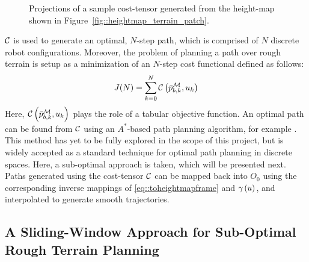 				\begin{figure}
					\centering
					\caption{Projections of a sample cost-tensor generated from the height-map shown in Figure~\ref{fig::heightmap_terrain_patch}.}
					\label{fig::cost_map}
				\end{figure}

			${\cal C}$ is used to generate an optimal, $N$-step path, which is comprised of $N$ discrete robot configurations. Moreover, the problem of planning a path over rough terrain is setup as a minimization of an $N$-step cost functional defined as follows:
				\begin{equation}			
					J(N) = \sum_{k=0}^N {\cal C}\left(\bar{p}^{{\cal M}}_{b,k},u_{k}\right)
				\end{equation}
			Here, ${\cal C}\left(\bar{p}^{{\cal M}}_{b,k},u_{k}\right)$ plays the role of a tabular objective function. An optimal path can be found from ${\cal C}$ using an $A^{*}$-based path planning algorithm, for example \cite{Hart1968}. This method has yet to be fully explored in the scope of this project, but is widely accepted as a standard technique for optimal path planning in discrete spaces. Here, a sub-optimal approach is taken, which will be presented next.  Paths generated using the cost-tensor ${\cal C}$ can be mapped back into $O_{0}$ using the corresponding inverse mappings of \ref{eq::toheightmapframe} and $\gamma\left(u\right)$, and interpolated to generate smooth trajectories.
			






		\subsection{A Sliding-Window Approach for Sub-Optimal Rough Terrain Planning}

